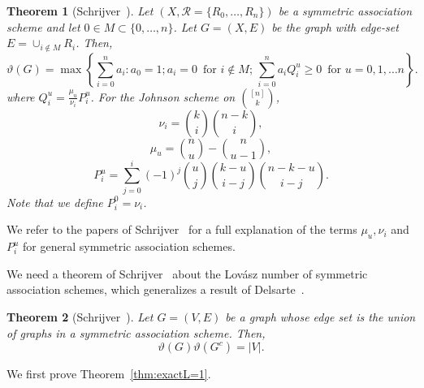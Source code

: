 \documentclass[11pt]{article}
\newtheorem{theorem}{Theorem}[section]
\theoremstyle{definition}
\theoremstyle{remark}
\begin{document}
\begin{theorem}[Schrijver~\cite{Sch1979}]\label{thm:schlp}
Let $(X, \mathcal{R} = \{R_0, \ldots, R_n\})$ be a symmetric association scheme and let $0\in M \subset \{0, \ldots, n\}$. Let $G = (X, E)$ be the graph with edge-set $E = \cup_{i\notin M} R_i$. Then, 
\begin{equation}\label{eqn:schlp}
\vartheta(G) = \max\left\{\sum_{i=0}^na_i : a_0 = 1; a_i =0\, \text{ for } i\notin M; \, \sum_{i=0}^na_iQ_i^u\ge 0\, \text{ for } u=0, 1, \ldots n\right\}.
\end{equation}
where $Q_i^u = \frac{\mu_u}{\nu_i}P_i^u$. For the Johnson scheme on $\binom{[n]}{k}$, 
\[\nu_i = \binom{k}{i}\binom{n-k}{i},\]
\[\mu_u = \binom{n}{u} - \binom{n}{u-1},\]
\[P_i^u = \sum_{j=0}^i (-1)^j \binom{u}{j} \binom{k-u}{i-j}\binom{n-k-u}{i-j}.\]
Note that we define $P_i^0 = \nu_i$. 
\end{theorem} 

We refer to the papers of Schrijver~\cite{Sch1979, Sch1978} for a full explanation of the terms $\mu_u, \nu_i$ and $P_i^u$ for general symmetric association schemes.

We need a theorem of Schrijver~\cite{Sch1979} about the Lov\'asz number of symmetric association schemes, which generalizes a result of Delsarte~\cite{Del1973}. 

\begin{theorem}[Schrijver~\cite{Sch1979}]\label{thm:schprodthm}
Let $G = (V, E)$ be a graph whose edge set is the union of graphs in a symmetric association scheme. Then, 
\[\vartheta(G)\vartheta(G^c) = |V|.\]
\end{theorem}

We first prove Theorem~\ref{thm:exactL=1}. 
\end{document}
